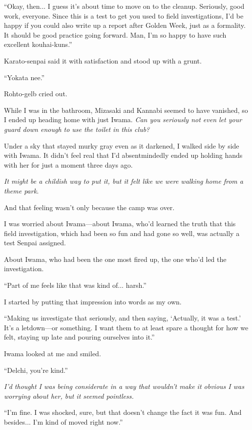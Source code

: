 \documentclass[
    a4paper,
    12pt,
    twoside,
    openany,
    UTF8,
    fontset=windows
]{ctexbook}
\begin{document}
``Okay, then... I guess it's about time to move on to the cleanup. Seriously, good work, everyone. Since this is a test to get you used to field investigations, I'd be happy if you could also write up a report after Golden Week, just as a formality. It should be good practice going forward. Man, I'm so happy to have such excellent kouhai-kuns.''

Karato-senpai said it with satisfaction and stood up with a grunt.

``Yokata nee.''

Rohto-gelb cried out.

While I was in the bathroom, Mizasaki and Kannabi seemed to have vanished, so I ended up heading home with just Iwama. \textit{Can you seriously not even let your guard down enough to use the toilet in this club?}

Under a sky that stayed murky gray even as it darkened, I walked side by side with Iwama. It didn't feel real that I'd absentmindedly ended up holding hands with her for just a moment three days ago.

\textit{It might be a childish way to put it, but it felt like we were walking home from a theme park.}

And that feeling wasn't only because the camp was over.

I was worried about Iwama---about Iwama, who'd learned the truth that this field investigation, which had been so fun and had gone so well, was actually a test Senpai assigned.

About Iwama, who had been the one most fired up, the one who'd led the investigation.

``Part of me feels like that was kind of... harsh.''

I started by putting that impression into words as my own.

``Making us investigate that seriously, and then saying, `Actually, it was a test.' It's a letdown---or something. I want them to at least spare a thought for how we felt, staying up late and pouring ourselves into it.''

Iwama looked at me and smiled.

``Delchi, you're kind.''

\textit{I'd thought I was being considerate in a way that wouldn't make it obvious I was worrying about her, but it seemed pointless.}

``I'm fine. I was shocked, sure, but that doesn't change the fact it was fun. And besides... I'm kind of moved right now.''
\end{document}
